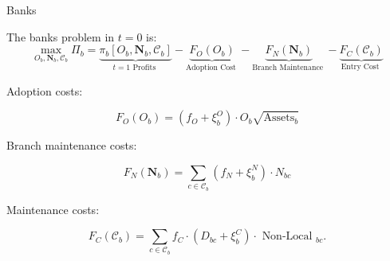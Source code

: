 \documentclass[notes,10pt, aspectratio=169]{beamer}
\newenvironment{wideitemize}{\itemize\addtolength{\itemsep}{10pt}}{\enditemize}
\begin{document}
\begin{frame}{Banks}

    \begin{wideitemize}
        \item The banks problem in $t=0$ is:
        $$
\max _{O_b, \boldsymbol{N}_b, \mathcal{C}_b} \Pi_b=\underbrace{\pi_b\left[O_b, \boldsymbol{N}_b, \mathcal{C}_b\right]}_{t=1 \text { Profits }}-\underbrace{F_O\left(O_b\right)}_{\text {Adoption Cost }}-\underbrace{F_N\left(\boldsymbol{N}_b\right)}_{\text {Branch Maintenance }}-\underbrace{F_C\left(\mathcal{C}_b\right)}_{\text {Entry Cost }}
    $$



    \item Adoption costs:


$$
F_O\left(O_b\right)=\left(f_O+\xi_b^O\right) \cdot O_b \sqrt{\operatorname{Assets}_b}
$$




\item Branch maintenance costs:

$$
F_N\left(\boldsymbol{N}_b\right)=\sum_{c \in \mathcal{C}_b}\left(f_N+\xi_b^N\right) \cdot N_{b c}
$$

\item Maintenance costs:


$$
F_C\left(\mathcal{C}_b\right)=\sum_{c \in \mathcal{C}_b} f_C \cdot\left(D_{b c}+\xi_b^C\right) \cdot \text { Non-Local }_{b c} .
$$

    
\end{wideitemize}

\end{frame}
\end{document}
